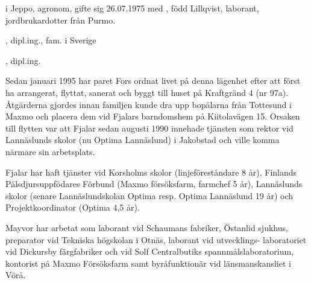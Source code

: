 


 i Jeppo, agronom, gifte sig 26.07.1975 med , född Lillqvist, laborant, jordbrukardotter från Purmo.

\begin{jhchildren}
  \item {}, dipl.ing., fam. i Sverige
  \item {}, dipl.ing.
\end{jhchildren}


Sedan januari 1995 har paret Fors ordnat livet på denna lägenhet efter att först ha arrangerat, flyttat, sanerat och byggt till huset på Kraftgränd 4 (nr 97a). Åtgärderna gjordes innan familjen kunde dra upp bopålarna från Tottesund i Maxmo och placera dem vid Fjalars barndomshem på Kiitolavägen 15. Orsaken till flytten var att Fjalar sedan augusti 1990 innehade tjänsten som rektor vid Lannäslunds skolor (nu Optima Lannäslund) i Jakobstad och ville komma närmare sin arbetsplats.

Fjalar har haft tjänster vid Korsholms skolor (linjeföreståndare 8 år), Finlands Pälsdjursuppfödares Förbund (Maxmo försöksfarm, farmchef 5 år), Lannäslunds skolor (senare Lannäslundskolan Optima resp. Optima Lannäslund 19 år) och Projektkoordinator (Optima 4,5 år).

Mayvor har arbetat som laborant vid Schaumans fabriker, Östanlid sjukhus, preparator vid Tekniska högskolan i Otnäs, laborant vid utvecklings- laboratoriet vid Dickursby färgfabriker och vid Solf Centralbutiks spannmålslaboratorium, kontorist på Maxmo Försöksfarm samt byråfunktionär vid länsmanskansliet i Vörå.

